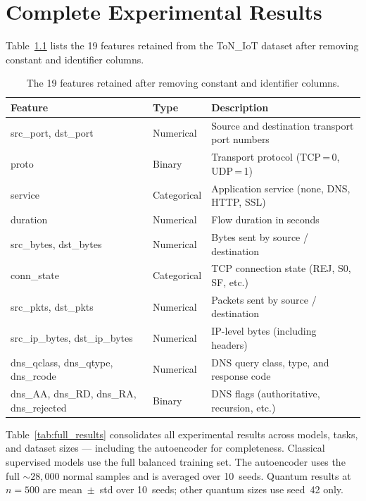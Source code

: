 
\chapter{Complete Experimental Results}
\label{app:full_results}

Table~\ref{tab:features} lists the 19 features retained from the ToN\_IoT dataset after removing constant and identifier columns.

\begin{table}[ht]
    \centering
    \small
    \begin{tabular}{llp{7.5cm}}
        \toprule
        \textbf{Feature} & \textbf{Type} & \textbf{Description} \\
        \midrule
        src\_port, dst\_port  & Numerical & Source and destination transport port numbers \\
        proto                & Binary    & Transport protocol (TCP\,=\,0, UDP\,=\,1) \\
        service              & Categorical & Application service (none, DNS, HTTP, SSL) \\
        duration             & Numerical & Flow duration in seconds \\
        src\_bytes, dst\_bytes & Numerical & Bytes sent by source / destination \\
        conn\_state           & Categorical & TCP connection state (REJ, S0, SF, etc.) \\
        src\_pkts, dst\_pkts   & Numerical & Packets sent by source / destination \\
        src\_ip\_bytes, dst\_ip\_bytes & Numerical & IP-level bytes (including headers) \\
        dns\_qclass, dns\_qtype, dns\_rcode & Numerical & DNS query class, type, and response code \\
        dns\_AA, dns\_RD, dns\_RA, dns\_rejected & Binary & DNS flags (authoritative, recursion, etc.) \\
        \bottomrule
    \end{tabular}
    \caption{The 19 features retained after removing constant and identifier columns.}
    \label{tab:features}
\end{table}

Table~\ref{tab:full_results} consolidates all experimental results across models, tasks, and dataset sizes --- including the autoencoder for completeness. Classical supervised models use the full balanced training set. The autoencoder uses the full ${\sim}28{,}000$ normal samples and is averaged over 10~seeds. Quantum results at $n=500$ are mean~$\pm$~std over 10~seeds; other quantum sizes use seed~42 only.

